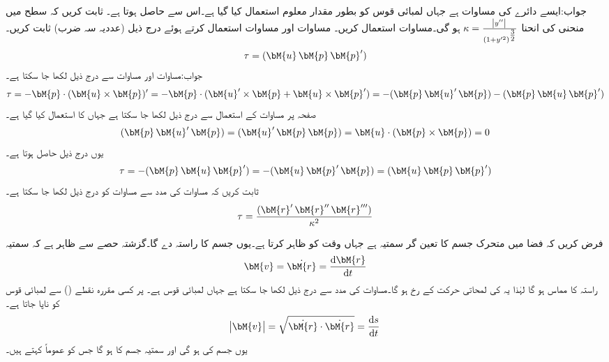 جواب:ایسے دائرے کی مساوات  ہے جہاں لمبائی قوس کو بطور مقدار معلوم استعمال کیا گیا ہے۔اس سے  حاصل ہوتا ہے۔
ثابت کریں کہ  سطح میں منحنی  کی انحنا 
$\kappa=\tfrac{\abs{y''}}{(1+y'^2)^{\tfrac{3}{2}}}$
ہو گی۔مساوات  استعمال کریں۔
مساوات  اور مساوات  استعمال کرتے ہوئے درج ذیل (عددیہ سہ ضرب)  ثابت کریں۔
\begin{align}\label{مساوات_الاحصاء_مروڑ}
\tau=(\bM{u}\,\bM{p}\, \bM{p}')
\end{align}
جواب:مساوات  اور مساوات  سے درج ذیل لکھا جا سکتا ہے۔
\begin{align*}
\tau=-\bM{p}\cdot(\bM{u}\times \bM{p})'=-\bM{p}\cdot(\bM{u}'\times \bM{p}+\bM{u}\times \bM{p}')=-(\bM{p}\,\bM{u}'\,\bM{p})-(\bM{p}\,\bM{u}\,\bM{p}')
\end{align*}
صفحہ  پر مساوات  کے استعمال سے درج ذیل لکھا جا سکتا ہے جہاں
  کا استعمال کیا گیا ہے۔
\begin{align*}
(\bM{p}\,\bM{u}'\,\bM{p})=(\bM{u}'\,\bM{p}\,\bM{p})=\bM{u}\cdot(\bM{p}\times \bM{p})=0
\end{align*}
یوں درج ذیل حاصل ہوتا ہے۔
\begin{align*}
\tau=-(\bM{p}\,\bM{u}\,\bM{p}')=-(\bM{u}\,\bM{p}'\, \bM{p})=(\bM{u}\,\bM{p}\, \bM{p}')
\end{align*}
ثابت کریں کہ مساوات  کی مدد سے  مساوات  کو درج ذیل لکھا جا سکتا ہے۔
\begin{align}
\tau=\frac{(\bM{r}'\,\bM{r}''\,\bM{r}''')}{\kappa^2}
\end{align}

فرض کریں کہ فضا میں متحرک جسم  کا تعین گر سمتیہ  ہے جہاں  وقت کو ظاہر کرتا ہے۔یوں  جسم  کا راستہ  دے گا۔گزشتہ حصے سے ظاہر ہے کہ سمتیہ
\begin{align}
\bM{v}=\dot{\bM{r}}=\frac{\dif \bM{r}}{\dif t}
\end{align} 
راستہ  کا مماس ہو گا لہٰذا یہ  کی لمحاتی حرکت کے رخ ہو گا۔مساوات  کی مدد سے درج ذیل لکھا جا سکتا ہے  جہاں  لمبائی قوس ہے۔ پر کسی مقررہ نقطے () سے لمبائی قوس  کو  ناپا جاتا ہے۔
\begin{align}
\abs{\bM{v}}=\sqrt{\dot{\bM{r}}\cdot \dot{\bM{r}}}=\frac{\dif s}{\dif t}
\end{align}
یوں  جسم  کی  ہو گی اور سمتیہ  جسم  کا  ہو گا جس کو عموماً  کہتے ہیں۔

